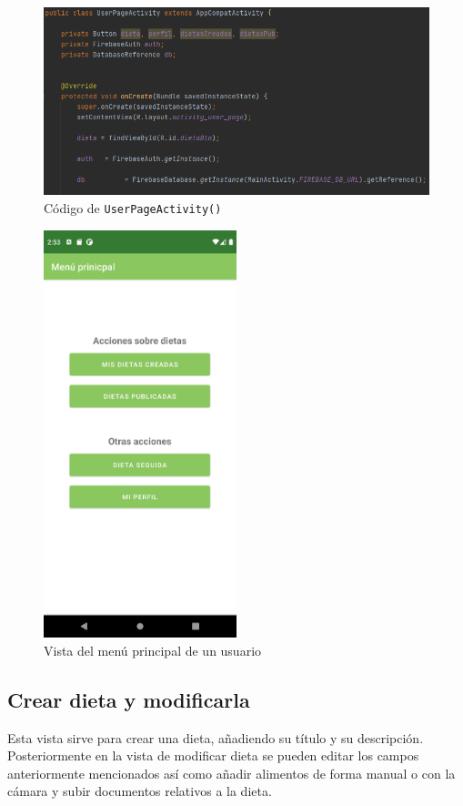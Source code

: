 \begin{figure}[H]
    \centering
    \includegraphics[width=\textwidth]{Images/Capitulo7/userpageact.png}
    \caption{Código de \texttt{UserPageActivity()}}
    \label{fig:userpageact}
\end{figure}

\begin{figure}[H]
    \centering
    \includegraphics[width=0.5\textwidth]{Images/Capitulo7/udashboard.png}
    \caption{Vista del menú principal de un usuario}
    \label{fig:udashboard}
\end{figure}

\subsection{Crear dieta y modificarla}
Esta vista sirve para crear una dieta, añadiendo su título y su descripción. Posteriormente en la vista de modificar dieta se pueden editar los campos anteriormente mencionados así como añadir alimentos de forma manual o con la cámara y subir documentos relativos a la dieta.

